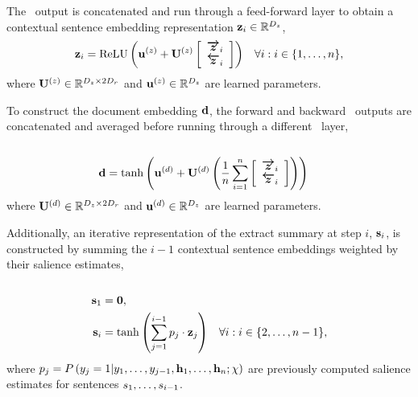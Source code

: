 The \gru~output is concatenated and run through a feed-forward layer to obtain
a contextual sentence embedding representation $\mathbf{z}_i \in
\mathbb{R}^{{D_z}}$,\\

\begin{align}
\mathbf{z}_i  & = \operatorname{ReLU}\left(\mathbf{u}^{(z)} + \mathbf{U}^{(z)} \left[ \begin{array}{c} \boldsymbol{\overrightarrow{z}}_i \\ \boldsymbol{\overleftarrow{z}}_i  \end{array} \right]  \right) &
    \forall i : i \in \{1,\ldots,n\},
\end{align}
where $\mathbf{U}^{(z)} \in \mathbb{R}^{{D_z} \times 2{D_r}}$ and $\mathbf{u}^{(z)}
\in \mathbb{R}^{{D_z}}$ are learned parameters.

To construct the document embedding $\mathbf{d}$, the forward and backward
\gru~outputs are concatenated and averaged before running through a different
\feedforward~layer,\\

\\[-40pt]
\begin{align}
\mathbf{d}  & = \tanh\left(\mathbf{u}^{(d)} + \mathbf{U}^{(d)} \left(\frac{1}{n}\sum_{i=1}^{n} \left[ \begin{array}{c} \boldsymbol{\overrightarrow{z}}_i \\ \boldsymbol{\overleftarrow{z}}_i  \end{array} \right] \right) \right)
\end{align}
where $\mathbf{U}^{(d)} \in \mathbb{R}^{{D_z} \times 2{D_r}}$ and $\mathbf{u}^{(d)}
\in \mathbb{R}^{{D_z}}$ are learned parameters.

Additionally, an iterative representation of the extract summary at step $i$,
$\mathbf{s}_i$, is constructed by summing the $i-1$ contextual sentence embeddings
weighted by their salience estimates,\\

\\[-40pt]
\begin{align}
\mathbf{s}_1 & = \mathbf{0}, \\
\mathbf{s}_i & = \tanh\left(\sum_{j=1}^{i-1} p_j \cdot \mathbf{z}_j\right)
& \forall i: i \in \{2,\ldots,n-1 \},
\end{align}
where $p_j=
P\left(y_j=1|y_1,\ldots,y_{j-1},\mathbf{h}_1, \ldots,
\mathbf{h}_n; \chi\right)$ are previously computed salience estimates
for sentences $s_1,\ldots,s_{i-1}$.

